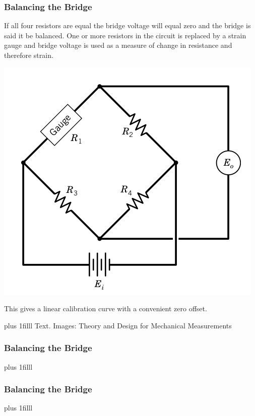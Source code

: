 \documentclass[fleqn]{beamer} %
\newcommand{\sectionIIsubsectionIIItitle}{Balancing the Bridge}
\newcommand{\btVFill}{\vskip0pt plus 1filll}
\begin{document}
			\begin{frame}
				\frametitle{\sectionIIsubsectionIIItitle} 

				\bigskip

				If all four resistors are equal the bridge voltage will equal zero and the bridge is said it be {\BL balanced}. 
				One or more resistors in the circuit is replaced by a strain gauge and bridge voltage is used as a measure of change in resistance and therefore strain. \vspc

				\includegraphics[scale=.2]{images/gauge_in_bridge_quarter.png} 

				This gives a linear {\PR calibration curve} with a convenient {\RD zero offset}. \vspc 
				
				\btVFill
				{\tiny Text. Images: Theory and Design for Mechanical Measurements}

			\end{frame}

			\begin{frame}
				\frametitle{\sectionIIsubsectionIIItitle}

				\bigskip


				\btVFill
			
			\end{frame}

			\begin{frame}
			\frametitle{\sectionIIsubsectionIIItitle}




				\btVFill

			\end{frame}
\end{document}
